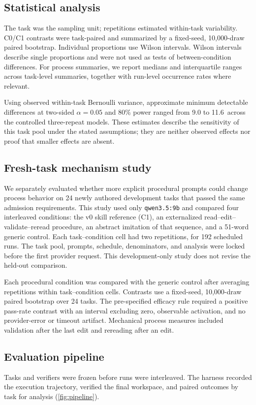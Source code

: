 \documentclass[10pt]{article}
\newcommand{\pp}{\,\text{pp}}
\newcommand{\QwenWeak}{\texttt{qwen3.5:\allowbreak 9b}}
\begin{document}
\subsection{Statistical analysis}
The task was the sampling unit; repetitions estimated within-task variability. C0/C1 contrasts were task-paired and summarized by a fixed-seed, 10,000-draw paired bootstrap. Individual proportions use Wilson intervals. Wilson intervals describe single proportions and were not used as tests of between-condition differences. For process summaries, we report medians and interquartile ranges across task-level summaries, together with run-level occurrence rates where relevant.

Using observed within-task Bernoulli variance, approximate minimum detectable differences at two-sided \(\alpha=0.05\) and 80\% power ranged from 9.0 to 11.6\pp{} across the controlled three-repeat models. These estimates describe the sensitivity of this task pool under the stated assumptions; they are neither observed effects nor proof that smaller effects are absent.

\subsection{Fresh-task mechanism study}
We separately evaluated whether more explicit procedural prompts could change process behavior on 24 newly authored development tasks that passed the same admission requirements. This study used only \QwenWeak{} and compared four interleaved conditions: the v0 skill reference (C1), an externalized read--edit--validate--reread procedure, an abstract imitation of that sequence, and a 51-word generic control. Each task--condition cell had two repetitions, for 192 scheduled runs. The task pool, prompts, schedule, denominators, and analysis were locked before the first provider request. This development-only study does not revise the held-out comparison.

Each procedural condition was compared with the generic control after averaging repetitions within task--condition cells. Contrasts use a fixed-seed, 10,000-draw paired bootstrap over 24 tasks. The pre-specified efficacy rule required a positive pass-rate contrast with an interval excluding zero, observable activation, and no provider-error or timeout artifact. Mechanical process measures included validation after the last edit and rereading after an edit.

\subsection{Evaluation pipeline}
Tasks and verifiers were frozen before runs were interleaved. The harness recorded the execution trajectory, verified the final workspace, and paired outcomes by task for analysis (\cref{fig:pipeline}).
\end{document}
